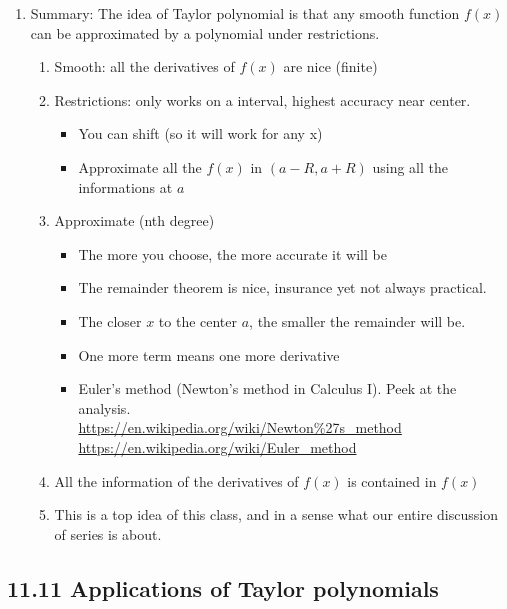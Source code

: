 \documentclass{article}
\begin{document}
\begin{enumerate}
\item Summary: The idea of Taylor polynomial is that any smooth function $f(x)$ can be approximated by a polynomial under restrictions.
\begin{enumerate}
\item Smooth: all the derivatives of $f(x)$ are nice (finite)
\item Restrictions: only works on a interval, highest accuracy near center. 
\begin{itemize}
\item You can shift (so it will work for any x)
\item Approximate all the $f(x)$ in $(a-R,a+R)$ using all the informations at $a$
\end{itemize}
\item Approximate (nth degree)
\begin{itemize}
\item The more you choose, the more accurate it will be
\item The remainder theorem is nice, insurance yet not always practical.
\item The closer $x$ to the center $a$, the smaller the remainder will be.
\item One more term means one more derivative
\item Euler's method (Newton's method in Calculus I). Peek at the analysis. \\
\url{https://en.wikipedia.org/wiki/Newton%27s_method} \\
\url{https://en.wikipedia.org/wiki/Euler_method}
\end{itemize}
\item All the information of the derivatives of $f(x)$ is contained in $f(x)$
\item This is a top idea of this class, and in a sense what our entire discussion of series is about.
\end{enumerate}
\end{enumerate}


\subsection{11.11 Applications of Taylor polynomials}



\end{document}
